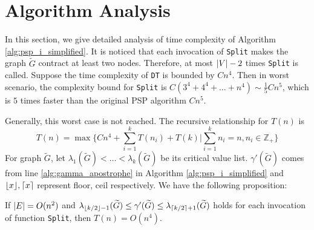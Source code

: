 \documentclass[runningheads]{llncs}
\begin{document}
\section{Algorithm Analysis}\label{sec:AA}
In this section, we give detailed analysis of time complexity of Algorithm \ref{alg:psp_i_simplified}.
It is noticed that each invocation of \texttt{Split} makes the graph $\widetilde{G}$ contract at least two nodes. Therefore, at most $\lvert V\rvert-2$ times \texttt{Split} is called. Suppose the time complexity of \texttt{DT} is bounded by $Cn^4$. Then in worst scenario, the complexity bound for \texttt{Split} is $C(3^4+4^4 + \dots + n^4) \sim \frac{1}{5}Cn^5$, which is $5$ times faster than the original PSP algorithm $Cn^5$.

Generally, this worst case is not reached. The recursive relationship for $T(n)$ is
\begin{equation}\label{eq:Tn}
T(n) = \max \{ C n^4 + \sum_{i=1}^k T(n_i) + T(k) | \sum_{i=1}^k n_i = n, n_i \in \mathbb{Z}_{+} \}
\end{equation}	
For graph $\widetilde{G}$, let $\lambda_1(\widetilde{G}) < \dots < \lambda_k(\widetilde{G})$ be its critical value list. $\gamma'(\widetilde{G})$ comes from line \ref{alg:gamma_apostrophe} in Algorithm \ref{alg:psp_i_simplified} and $\lfloor x\rfloor, \lceil x\rceil$ represent floor, ceil respectively.
We have the following proposition:
\begin{proposition}\label{prop:alg_complexity}
	If $\lvert E\rvert = O(n^2)$ and $ \lambda_{\lfloor k/2\rfloor - 1}(\widetilde{G}) \leq \gamma'(\widetilde{G}) \leq \lambda_{\lceil k/2\rceil + 1}(\widetilde{G}) $ holds for each invocation of function \texttt{Split}, then $T(n) = O(n^4)$.
\end{proposition}
\end{document}
